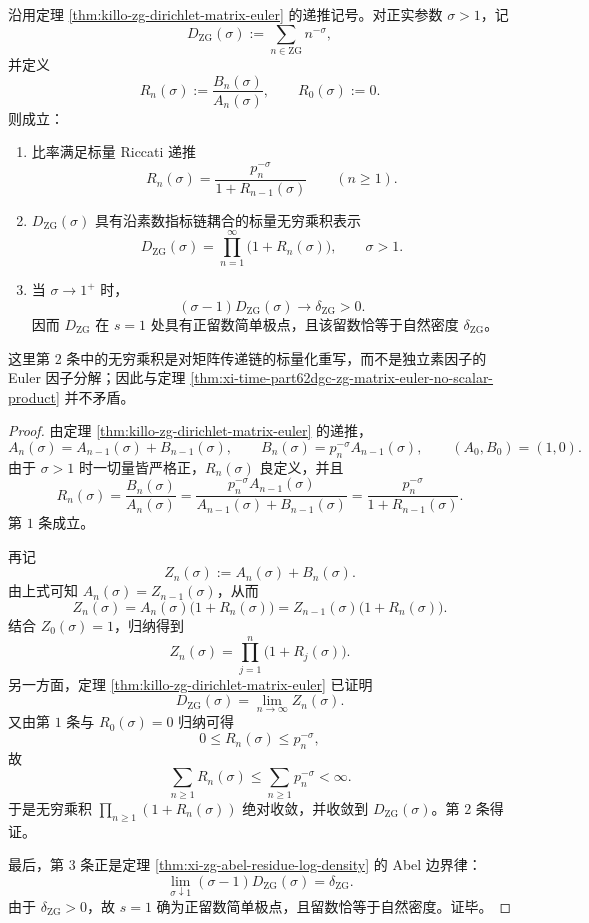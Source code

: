 \begin{theorem}\label{thm:xi-time-part62dcb-zg-dirichlet-riccati-residue}
沿用定理 \ref{thm:killo-zg-dirichlet-matrix-euler} 的递推记号。对正实参数 \(\sigma>1\)，记
\[
D_{\mathrm{ZG}}(\sigma):=\sum_{n\in \mathrm{ZG}}n^{-\sigma},
\]
并定义
\[
R_n(\sigma):=\frac{B_n(\sigma)}{A_n(\sigma)},
\qquad
R_0(\sigma):=0.
\]
则成立：
\begin{enumerate}
  \item 比率满足标量 Riccati 递推
  \[
  R_n(\sigma)=\frac{p_n^{-\sigma}}{1+R_{n-1}(\sigma)}
  \qquad (n\ge 1).
  \]
  \item \(D_{\mathrm{ZG}}(\sigma)\) 具有沿素数指标链耦合的标量无穷乘积表示
  \[
  D_{\mathrm{ZG}}(\sigma)
  =
  \prod_{n=1}^{\infty}\bigl(1+R_n(\sigma)\bigr),
  \qquad
  \sigma>1.
  \]
  \item 当 \(\sigma\to 1^+\) 时，
  \[
  (\sigma-1)D_{\mathrm{ZG}}(\sigma)\longrightarrow \delta_{\mathrm{ZG}}>0.
  \]
  因而 \(D_{\mathrm{ZG}}\) 在 \(s=1\) 处具有正留数简单极点，且该留数恰等于自然密度 \(\delta_{\mathrm{ZG}}\)。
\end{enumerate}
这里第 \(2\) 条中的无穷乘积是对矩阵传递链的标量化重写，而不是独立素因子的 Euler 因子分解；因此与定理 \ref{thm:xi-time-part62dgc-zg-matrix-euler-no-scalar-product} 并不矛盾。
\end{theorem}
\begin{proof}
由定理 \ref{thm:killo-zg-dirichlet-matrix-euler} 的递推，
\[
A_n(\sigma)=A_{n-1}(\sigma)+B_{n-1}(\sigma),
\qquad
B_n(\sigma)=p_n^{-\sigma}A_{n-1}(\sigma),
\qquad
(A_0,B_0)=(1,0).
\]
由于 \(\sigma>1\) 时一切量皆严格正，\(R_n(\sigma)\) 良定义，并且
\[
R_n(\sigma)
=
\frac{B_n(\sigma)}{A_n(\sigma)}
=
\frac{p_n^{-\sigma}A_{n-1}(\sigma)}{A_{n-1}(\sigma)+B_{n-1}(\sigma)}
=
\frac{p_n^{-\sigma}}{1+R_{n-1}(\sigma)}.
\]
第 \(1\) 条成立。

再记
\[
Z_n(\sigma):=A_n(\sigma)+B_n(\sigma).
\]
由上式可知 \(A_n(\sigma)=Z_{n-1}(\sigma)\)，从而
\[
Z_n(\sigma)
=
A_n(\sigma)\bigl(1+R_n(\sigma)\bigr)
=
Z_{n-1}(\sigma)\bigl(1+R_n(\sigma)\bigr).
\]
结合 \(Z_0(\sigma)=1\)，归纳得到
\[
Z_n(\sigma)=\prod_{j=1}^{n}\bigl(1+R_j(\sigma)\bigr).
\]
另一方面，定理 \ref{thm:killo-zg-dirichlet-matrix-euler} 已证明
\[
D_{\mathrm{ZG}}(\sigma)=\lim_{n\to\infty}Z_n(\sigma).
\]
又由第 \(1\) 条与 \(R_0(\sigma)=0\) 归纳可得
\[
0\le R_n(\sigma)\le p_n^{-\sigma},
\]
故
\[
\sum_{n\ge 1}R_n(\sigma)\le \sum_{n\ge 1}p_n^{-\sigma}<\infty.
\]
于是无穷乘积 \(\prod_{n\ge 1}(1+R_n(\sigma))\) 绝对收敛，并收敛到
\(D_{\mathrm{ZG}}(\sigma)\)。第 \(2\) 条得证。

最后，第 \(3\) 条正是定理 \ref{thm:xi-zg-abel-residue-log-density} 的 Abel 边界律：
\[
\lim_{\sigma\downarrow 1}(\sigma-1)D_{\mathrm{ZG}}(\sigma)=\delta_{\mathrm{ZG}}.
\]
由于 \(\delta_{\mathrm{ZG}}>0\)，故 \(s=1\) 确为正留数简单极点，且留数恰等于自然密度。证毕。
\end{proof}

